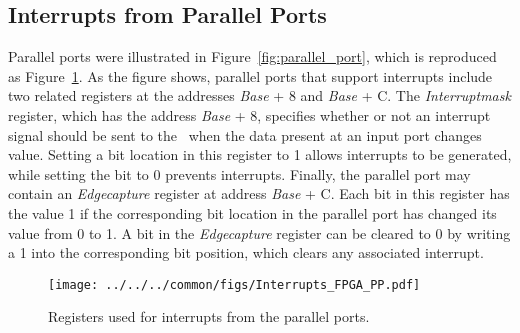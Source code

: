\subsection{Interrupts from Parallel Ports}

Parallel ports were illustrated in Figure~\ref{fig:parallel_port}, which is reproduced 
as Figure~\ref{fig:parallel_port_int}.
As the figure shows, parallel ports that support interrupts include two related registers 
at the addresses {\it Base} + 8 and {\it Base} + C.
The {\it Interruptmask} register, which has the address {\it Base} + 8, specifies whether 
or not an interrupt signal should be sent to the \GIC~when the data present at
an input port changes value.  Setting a bit location in this register to 1 allows 
interrupts to be generated, while setting the bit to 0 prevents interrupts. 
Finally, the parallel port may contain an {\it Edgecapture} register at address
{\it Base} + C.  Each bit in this register has the value 1 if the 
corresponding bit location in the parallel port has changed its value from 0 to 1.
A bit in the {\it Edgecapture} register can be cleared to 0
by writing a 1 into the corresponding bit position, which clears any associated interrupt. 

\begin{figure}[h!]
   \begin{center}
       \texttt{[image: ../../../common/figs/Interrupts\_FPGA\_PP.pdf]}
   \end{center}
   \caption{Registers used for interrupts from the parallel ports.}
	\label{fig:parallel_port_int}
\end{figure}


